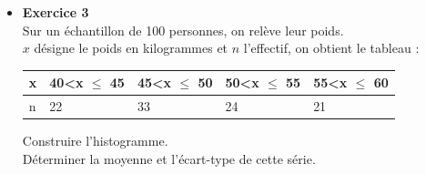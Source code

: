 \documentclass[a4paper,11pt]{book}
\begin{document}
\begin{itemize}
Construire l'histogramme.\\
Calculer la moyenne et l'\'ecart-type de cette s\'erie.\\
Avec {\tt Xcas}, on utilise un tableur que l'on obtient avec le raccourci clavier {\tt Alt+t}.\\
On remplit la colonne {\tt A} :\\
on met {\tt 150..155} dans {\tt A0}, {\tt 155..160} dans {\tt A1} etc...ou on 
tape dans {\tt A1}{\tt =A0+5} puis on remplit vers le bas avec le menu du 
tableur {\tt Edit} puis {\tt Remplir} puis {\tt Copier vers le bas}.\\
On remplit la colonne {\tt B} :\\
on met {\tt 30} dans {\tt B0}, {\tt 25} dans {\tt B1} etc...\\
On s\'electionne ces 2 colonnes pour cela, soit on le fait \`a la souris soit
 on tape dans la {\tt case de s\'election} {\tt A0..B3}.\\
Avec le menu du tableur {\tt Statistiques} puis {\tt 1d} puis {\tt histogram},
on obtient l'histogramme.\\
On tape dans {\tt A4} :\\
{\tt =mean(A0:A3,B0:B3)}\\
On obtient la moyenne :
{\tt 3187/20}\\
On tape dans {\tt B4} :\\
{\tt =stddev(A0:A3,B0:B3)}\\
On obtient l'\'ecart-type :
{\tt sqrt(12731/400) $\simeq$ 5.64158665625}\\
On obtient le r\'esultat dans la ligne de commande en appuyant sur {\tt eval} 
et la valeur approch\'ee avec la commande {\tt evalf}.
\item {\bf Exercice 3}\\
Sur un \'echantillon de 100 personnes, on rel\`eve leur poids.\\
$x$ d\'esigne le poids en kilogrammes et $n$ l'effectif, on obtient le tableau :
\begin{center}{\tt \begin{tabular}{|l|l|l|l|l|}
\hline
x & 40<x $\leq$ 45 & 45<x $\leq$ 50 & 50<x $\leq$ 55 & 55<x $\leq$ 60\\
\hline
n & 22 &33 &24&21\\
\hline
\end{tabular}}\end{center}

Construire l'histogramme.\\
D\'eterminer la moyenne  et l'\'ecart-type de cette s\'erie.


\end{itemize}
\end{document}
